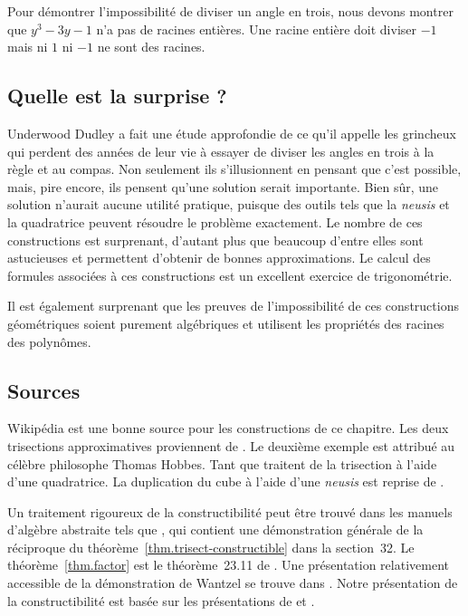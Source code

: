 Pour démontrer l'impossibilité de diviser un angle en trois, nous devons montrer que $y^3-3y-1$ n'a pas de racines entières. Une racine entière doit diviser $-1$ mais ni $1$ ni $-1$ ne sont des racines.

\subsection*{Quelle est la surprise ?}

Underwood Dudley a fait une étude approfondie de ce qu'il appelle les \og grincheux\fg{} qui perdent des années de leur vie à essayer de diviser les angles en trois à la règle et au compas. Non seulement ils s'illusionnent en pensant que c'est possible, mais, pire encore, ils pensent qu'une solution serait importante. Bien sûr, une solution n'aurait aucune utilité pratique, puisque des outils tels que la \emph{neusis} et la quadratrice peuvent résoudre le problème exactement. Le nombre de ces constructions est surprenant, d'autant plus que beaucoup d'entre elles sont astucieuses et permettent d'obtenir de bonnes approximations. Le calcul des formules associées à ces constructions est un excellent exercice de trigonométrie.

Il est également surprenant que les preuves de l'impossibilité de ces constructions géométriques soient purement algébriques et utilisent les propriétés des racines des polynômes.

\subsection*{Sources}

Wikipédia \cite{wiki:tri, wiki:neu, wiki:quad} est une bonne source pour les constructions de ce chapitre.
Les deux trisections approximatives proviennent de \cite [p.
~67--68, 95--96]{dudley-budget}. Le deuxième exemple est attribué au célèbre philosophe Thomas Hobbes. Tant \cite[p.~48--49]{martin} que \cite[p.~6--7]{dudley-budget} traitent de la trisection à l'aide d'une quadratrice.
La duplication du cube à l'aide d'une \emph{neusis} est reprise de \cite{dorrie2}.

Un traitement rigoureux de la constructibilité peut être trouvé dans les manuels d'algèbre abstraite tels que \cite{fraleigh}, qui contient une démonstration générale de la réciproque du théorème~\ref{thm.trisect-constructible} dans la section~32.
Le théorème~\ref{thm.factor} est 
 le théorème~23.11 de \cite{fraleigh}.
Une présentation relativement accessible de la démonstration de Wantzel se trouve dans \cite{suzuki}. Notre présentation de la constructibilité est basée sur les présentations de \cite[chap.~III]{courant} et \cite{laugwitz}.
